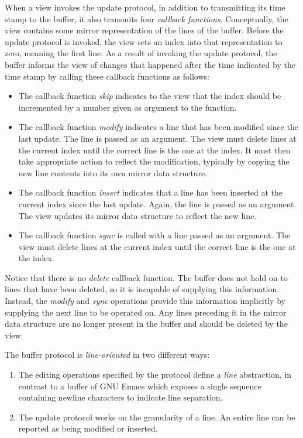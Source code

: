 When a view invokes the update protocol, in addition to transmitting
its time stamp to the buffer, it also transmits four \emph{callback
  functions}.  Conceptually, the view contains some mirror
representation of the lines of the buffer.  Before the update protocol
is invoked, the view sets an index into that representation to zero,
meaning the first line.  As  a result of invoking the update protocol,
the buffer informs the view of changes that happened after the time
indicated by the time stamp by calling these callback functions as
follows:

\begin{itemize}
\item The callback function \emph{skip} indicates to the view that the
  index should be incremented by a number given as argument to the
  function.
\item The callback function \emph{modify} indicates a line that has been
  modified since the last update.  The line is passed as an argument.
  The view must delete lines at the current index until the correct
  line is the one at the index.  It must then take appropriate action
  to reflect the modification, typically by copying the new line
  contents into its own mirror data structure.
\item The callback function \emph{insert} indicates that a line has
  been inserted at the current index since the last update.  Again,
  the line is passed as an argument.  The view updates its mirror data
  structure to reflect the new line.
\item The callback function \emph{sync} is called with a line passed
  as an argument.  The view must delete lines at the current index
  until the correct line is the one at the index.
\end{itemize}

Notice that there is no \emph{delete} callback function.  The buffer
does not hold on to lines that have been deleted, so it is incapable
of supplying this information.  Instead, the \emph{modify} and
\emph{sync} operations provide this information implicitly by
supplying the next line to be operated on.  Any lines preceding it in
the mirror data structure are no longer present in the buffer and
should be deleted by the view.

The buffer protocol is \emph{line-oriented} in two different ways:

\begin{enumerate}
\item The editing operations specified by the protocol define a
  \emph{line} abstraction, in contrast to a buffer of GNU Emacs
  \cite{Finseth:1980:TPTa} which exposes a single sequence containing
  newline characters to indicate line separation.
\item The update protocol works on the granularity of a line.  An
  entire line can be reported as being modified or inserted.
\end{enumerate}

